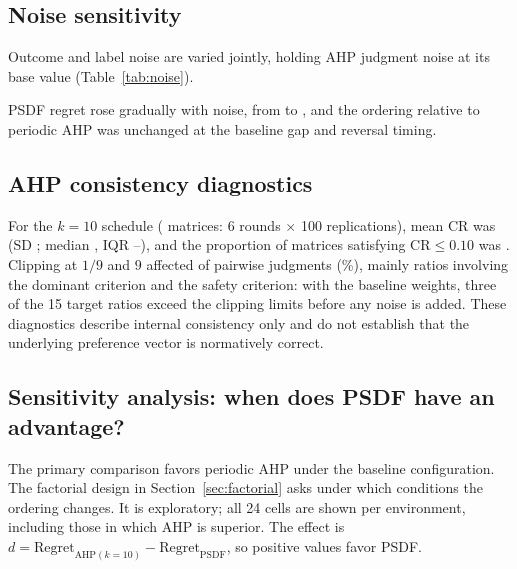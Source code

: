 \documentclass[12pt,a4paper]{article}
\begin{document}
\subsection{Noise sensitivity}
Outcome and label noise are varied jointly, holding AHP judgment noise at its base value (Table~\ref{tab:noise}).
\begin{table}[t]
\centering\small
\caption{Noise sensitivity: mean expected regret.}\label{tab:noise}

\end{table}
PSDF regret rose gradually with noise, from \NoisePSDFZero{} to \NoisePSDFHigh{}, and the ordering relative to periodic AHP was unchanged at the baseline gap and reversal timing.

\subsection{AHP consistency diagnostics}
For the $k=10$ schedule (\CRMatrices{} matrices: 6 rounds $\times$ 100 replications), mean CR was \CRMean{} (SD \CRSD{}; median \CRMedian{}, IQR \CRQOne--\CRQThree{}), and the proportion of matrices satisfying $\mathrm{CR}\le0.10$ was \CRProp{}. Clipping at $1/9$ and $9$ affected \ClipN{} of \ClipTotal{} pairwise judgments (\ClipPct\%), mainly ratios involving the dominant criterion and the safety criterion: with the baseline weights, three of the 15 target ratios exceed the clipping limits before any noise is added. These diagnostics describe internal consistency only and do not establish that the underlying preference vector is normatively correct.

\subsection{Sensitivity analysis: when does PSDF have an advantage?}
The primary comparison favors periodic AHP under the baseline configuration. The factorial design in Section~\ref{sec:factorial} asks under which conditions the ordering changes. It is exploratory; all 24 cells are shown per environment, including those in which AHP is superior. The effect is $d=\mathrm{Regret}_{\mathrm{AHP}(k=10)}-\mathrm{Regret}_{\mathrm{PSDF}}$, so positive values favor PSDF.

\begin{table}[t]
\centering\small
\caption{Regime map, synthetic environment: $d=\mathrm{Regret}_{\mathrm{AHP}}-\mathrm{Regret}_{\mathrm{PSDF}}$ ($k=10$; positive favors PSDF). An asterisk marks cells with Holm-adjusted $p<0.05$ across the 24 cells.}\label{tab:regime-syn}

\end{table}
\end{document}

